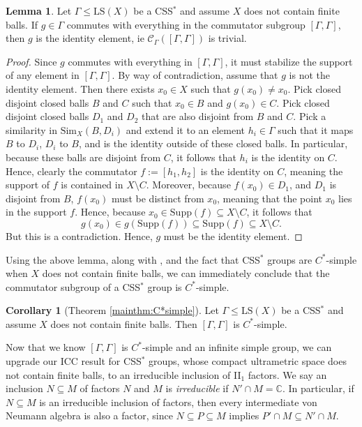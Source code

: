 \documentclass[12pt]{amsart}
\numberwithin{equation}{subsection}
\theoremstyle{definition}
\newtheorem{lemma}[theorem]{Lemma}
\newtheorem{corollary}[theorem]{Corollary}
\theoremstyle{definition}
\theoremstyle{remark}
\newcommand{\Sim}{\text{Sim}}
\newcommand{\supp}{\text{Supp}}
\begin{document}
\begin{lemma}\label{lemma:centralizerofcommutator}
Let $\Gamma \le \text{LS}(X)$ be a CSS$^*$ and assume $X$ does not contain finite balls. If $g \in \Gamma$ commutes with everything in the commutator subgroup $[\Gamma , \Gamma]$, then $g$ is the identity element, ie $\mathcal C_\Gamma ([\Gamma,\Gamma])$ is trivial.
\end{lemma}
\begin{proof}
Since $g$ commutes with everything in $[\Gamma , \Gamma ]$, it must stabilize the support of any element in $[\Gamma , \Gamma ]$. By way of contradiction, assume that $g$ is not the identity element. Then there exists $x_0 \in X$ such that $g(x_0) \neq x_0$. Pick closed disjoint closed balls $B$ and $C$ such that $x_0 \in B$ and $g(x_0) \in C$. Pick closed disjoint closed balls $D_1$ and $D_2$ that are also disjoint from $B$ and $C$. Pick a similarity in $\Sim_{X}(B,D_i)$ and extend it to an element $h_i \in \Gamma$ such that it maps $B$ to $D_i$, $D_i$ to $B$, and is the identity outside of these closed balls. In particular, because these balls are disjoint from $C$, it follows that $h_i$ is the identity on $C$. Hence, clearly the commutator $f := [h_1,h_2]$ is the identity on $C$, meaning the support of $f$ is contained in $X \setminus C$. Moreover, because $f(x_0) \in D_1$, and $D_1$ is disjoint from $B$, $f(x_0)$ must be distinct from $x_0$, meaning that the point $x_0$ lies in the support $f$. Hence, because $x_0 \in \supp (f) \subseteq X \setminus C$, it follows that 
$$g(x_0) \in g(\supp (f)) \subseteq \supp (f) \subseteq X \setminus C.$$
But this is a contradiction. Hence, $g$ must be the identity element. 
\end{proof}

Using the above lemma, along with \cite[Theorem 1.3]{Ursu2022}, and the fact that CSS$^*$ groups are $C^*$-simple when $X$ does not contain finite balls, we can immediately conclude that the commutator subgroup of a CSS$^*$ group is $C^*$-simple.

\begin{corollary}[Theorem \ref{mainthm:C*simple}]\label{cor:commutatorisC*simple}
Let $\Gamma \le \text{LS}(X)$ be a CSS$^*$ and assume $X$ does not contain finite balls. Then $[\Gamma , \Gamma ]$ is $C^*$-simple.
\end{corollary}

Now that we know $[\Gamma , \Gamma ]$ is $C^*$-simple and an infinite simple group, we can upgrade our ICC result for CSS$^*$ groups, whose compact ultrametric space does not contain finite balls, to an irreducible inclusion of II$_1$ factors. We say an inclusion $N \subseteq M$ of factors $N$ and $M$ is \emph{irreducible} if $N ' \cap M = \mathbb C$. In particular, if $N \subseteq M$ is an irreducible inclusion of factors, then every intermediate von Neumann algebra is also a factor, since $N \subseteq P \subseteq M$ implies $P' \cap M \subseteq N' \cap M$. 
\end{document}

